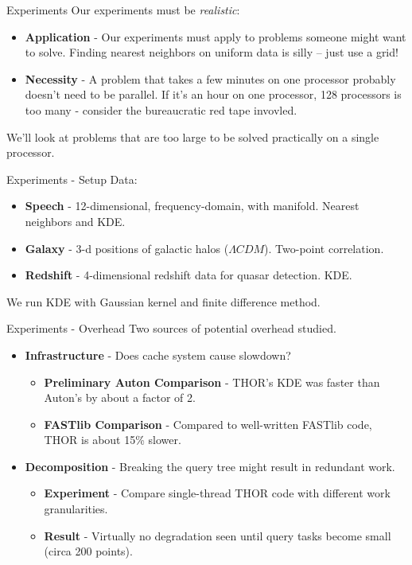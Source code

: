 \documentclass[pdf,colorBG,slideColor]{prosper}
\newcommand{\itemt}[1]{\item {\bf #1} -}
\begin{document}
\begin{slide}{Experiments}
  Our experiments must be {\em realistic}:
  \begin{itemize}
    \itemt{Application} Our experiments must apply to problems someone
    might want to solve.  Finding nearest neighbors on uniform data is
    silly -- just use a grid!
    \itemt{Necessity}
    A problem that takes a few minutes on one processor probably
    doesn't need to be parallel.
    If it's an hour on one processor, 128 processors is too many - consider
    the bureaucratic red tape invovled.
  \end{itemize}
  We'll look at problems that are too large to be solved practically on
  a single processor.
\end{slide}

\begin{slide}{Experiments - Setup}
  Data:
  \begin{itemize}
    \itemt{Speech}
    12-dimensional, frequency-domain, with manifold.
    Nearest neighbors and KDE.
    \itemt{Galaxy}
    3-d positions of galactic halos ($\Lambda CDM$).
    Two-point correlation.
    \itemt{Redshift}
    4-dimensional redshift data for quasar detection.
    KDE.
  \end{itemize}
  We run KDE with Gaussian kernel and finite difference method.
\end{slide}

\begin{slide}{Experiments - Overhead}
  Two sources of potential overhead studied.
  \begin{itemize}
    \itemt{Infrastructure} Does cache system cause slowdown?
    \begin{itemize}
      \itemt{Preliminary Auton Comparison}
      THOR's KDE was faster than Auton's by about a factor of 2.
      \itemt{FASTlib Comparison}
      Compared to well-written FASTlib code, THOR is about 15\% slower.
    \end{itemize}
    \itemt{Decomposition} Breaking the query tree might result in redundant
    work.
    \begin{itemize}
      \itemt{Experiment} Compare single-thread THOR code with different work granularities.
      \itemt{Result} Virtually no degradation seen until query tasks become
      small (circa 200 points).
    \end{itemize}
  \end{itemize}
\end{slide}
\end{document}
